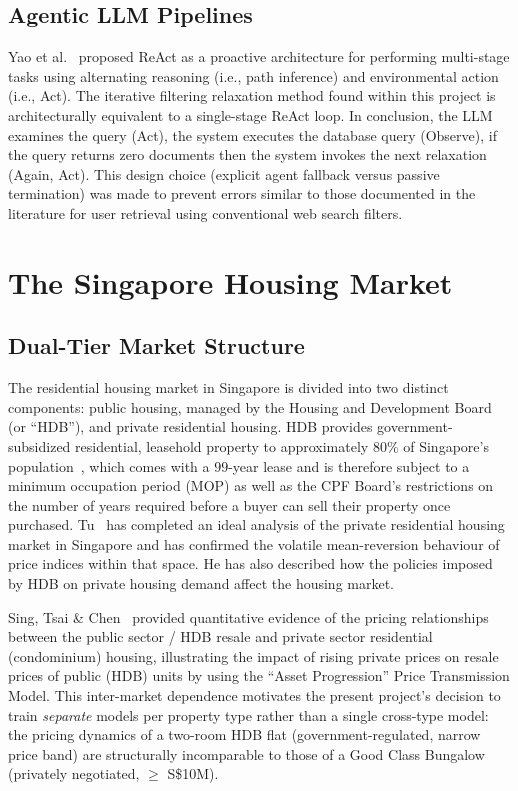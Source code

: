 \subsection{Agentic LLM Pipelines}

Yao et al.~\cite{yao2022react} proposed ReAct as a proactive architecture for 
performing multi-stage tasks using alternating reasoning (i.e., path 
inference) and environmental action (i.e., Act). The iterative filtering 
relaxation method found within this project is architecturally equivalent to a 
single-stage ReAct loop. In conclusion, the LLM examines the query (Act), the 
system executes the database query (Observe), if the query returns zero 
documents then the system invokes the next relaxation (Again, Act). This 
design choice (explicit agent fallback versus passive termination) was made to 
prevent errors similar to those documented in the literature for user 
retrieval using conventional web search filters.

\section{The Singapore Housing Market}

\subsection{Dual-Tier Market Structure}

The residential housing market in Singapore is divided into two distinct 
components: public housing, managed by the Housing and Development Board (or 
``HDB''), and private residential housing. HDB provides 
government-subsidized residential, leasehold property to approximately $80\%$ 
of Singapore's population~\cite{hdb2024annual}, which comes with a $99$-year 
lease and is therefore subject to a minimum occupation period (MOP) as well 
as the CPF Board's restrictions on the number of years required before a 
buyer can sell their property once purchased. Tu~\cite{tu2004dynamics} has 
completed an ideal analysis of the private residential housing market in 
Singapore and has confirmed the volatile mean-reversion behaviour of price 
indices within that space. He has also described how the policies imposed by 
HDB on private housing demand affect the housing market.

Sing, Tsai \& Chen~\cite{sing2006price} provided quantitative evidence of the 
pricing relationships between the public sector / HDB resale and private 
sector residential (condominium) housing, illustrating the impact of rising 
private prices on resale prices of public (HDB) units by using the ``Asset 
Progression'' Price Transmission Model. This inter-market dependence motivates the present project's decision to train \textit{separate} models per
property type rather than a single cross-type model: the pricing dynamics of a two-room HDB
flat (government-regulated, narrow price band) are structurally incomparable to those of a
Good Class Bungalow (privately negotiated, $\geq$ S\$10M).

